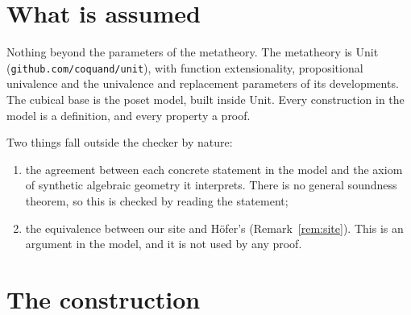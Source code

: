 \documentclass[11pt]{amsart}
\theoremstyle{definition}
\theoremstyle{remark}
\begin{document}
\section{What is assumed}

Nothing beyond the parameters of the metatheory. The metatheory is Unit
(\texttt{github.com/coquand/unit}), with function extensionality,
propositional univalence and the univalence and replacement parameters of
its developments. The cubical base is the poset model, built inside Unit.
Every construction in the model is a definition, and every property a
proof.

Two things fall outside the checker by nature:
\begin{enumerate}[label=(\alph*)]
\item the agreement between each concrete statement in the model and the
axiom of synthetic algebraic geometry it interprets. There is no general
soundness theorem, so this is checked by reading the statement;
\item the equivalence between our site and H\"ofer's
(Remark~\ref{rem:site}). This is an argument in the model, and it is not
used by any proof.
\end{enumerate}

\section{The construction}
\end{document}
